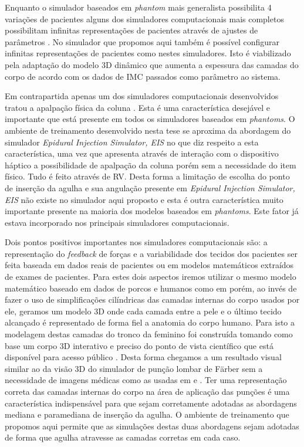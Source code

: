 Enquanto o simulador baseados em \textit{phantom} mais generalista possibilita 4 variações de pacientes alguns dos simuladores computacionais mais completos possibilitam infinitas representações de pacientes através de ajustes de parâmetros \cite{Stredney1996, Wilson2003, YantricInc2011, Brazil2017}. No simulador que propomos aqui também é possível configurar infinitas representações de pacientes como nestes simuladores. Isto é viabilizado pela adaptação do modelo 3D dinâmico que aumenta a espessura das camadas do corpo de acordo com os dados de \acrshort{IMC} passados como parâmetro ao sistema.  

Em contrapartida apenas um dos simuladores computacionais desenvolvidos tratou a apalpação física da coluna \cite{Wilson2003}. Esta é uma característica desejável e importante que está presente em todos os simuladores baseados em \textit{phantoms}. O ambiente de treinamento desenvolvido nesta tese se aproxima da abordagem do simulador \textit{Epidural Injection Simulator, EIS} \cite{Wilson2003} no que diz respeito a esta característica, uma vez que apresenta através de interação com o dispositivo háptico a possibilidade de apalpação da coluna porém sem a necessidade do item físico. Tudo é feito através de \acrshort{RV}. Desta forma a limitação de escolha do ponto de inserção da agulha e sua angulação presente em \textit{Epidural Injection Simulator, EIS} não existe no simulador aqui proposto e esta é outra característica muito importante presente na maioria dos modelos baseados em \textit{phantoms}. Este fator já estava incorporado nos principais simuladores computacionais.

Dois pontos positivos importantes nos simuladores computacionais são: a representação do \textit{feedback} de forças e a variabilidade dos tecidos dos pacientes ser feita baseada em dados reais de pacientes ou em modelos matemáticos extraídos de exames de pacientes. Para estes dois aspectos iremos utilizar o mesmo modelo matemático baseado em dados de porcos e humanos como em \textcite{Brazil2017} porém, ao invés de fazer o uso de simplificações cilíndricas das camadas internas do corpo usados por ele, geramos um modelo 3D onde cada camada entre a pele e o último tecido alcançado é representado de forma fiel a anatomia do corpo humano. Para isto a modelagem destas camadas do tronco da feminino foi construída tomando como base um corpo 3D interativo e preciso do ponto de vista científico que está disponível para acesso público \cite{BioDigitalInc2019}. Desta forma chegamos a um resultado visual similar ao da visão 3D do simulador de punção lombar de Färber sem a necessidade de imagens médicas como as usadas em \textcite{Farber2009} e \textcite{Dreifaldt2006}. Ter uma representação correta das camadas internas do corpo na área de aplicação das punções é uma característica indispensável para que sejam corretamente adotadas as abordagens mediana e paramediana de inserção da agulha. O ambiente de treinamento que propomos aqui permite que as simulações destas duas abordagens sejam adotadas de forma que agulha atravesse as camadas corretas em cada caso. 


